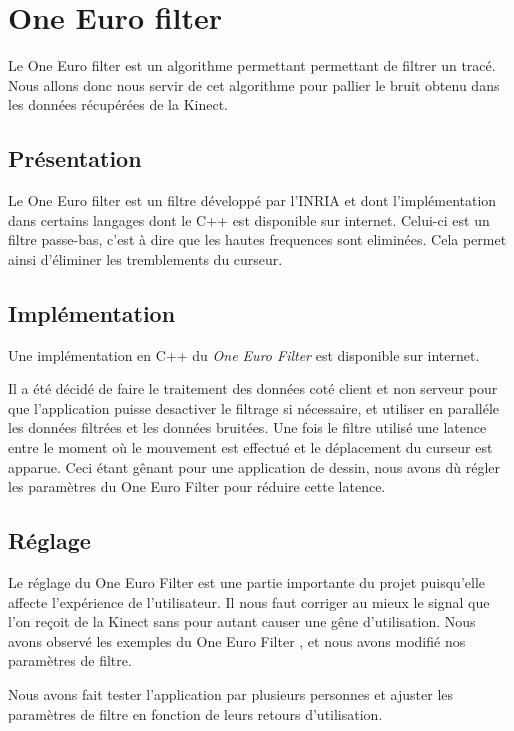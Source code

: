 \chapter{One Euro filter}

Le One Euro filter est un algorithme permettant permettant de filtrer un tracé. Nous allons donc nous servir de cet algorithme pour pallier le bruit obtenu dans les données récupérées de la Kinect.

\section{Présentation}
 Le One Euro filter \cite{oneeuro} est un filtre développé par l'INRIA et dont l'implémentation dans certains langages dont le C++ est disponible sur internet. Celui-ci est un filtre passe-bas, c'est à dire que les hautes frequences sont eliminées. Cela permet ainsi d'éliminer les tremblements du curseur.
	
\section{Implémentation}

Une implémentation en C++ du \textit{One Euro Filter} est disponible sur internet.


Il a été décidé de faire le traitement des données coté client et non serveur pour que l'application puisse desactiver le filtrage si nécessaire, et utiliser en paralléle les données filtrées et les données bruitées.
Une fois le filtre utilisé une latence entre le moment où le mouvement est effectué et le déplacement du curseur est apparue. Ceci étant gênant pour une application de dessin, nous avons dù régler les paramètres du One Euro Filter pour réduire cette latence.

\section{Réglage}

Le réglage du One Euro Filter est une partie importante du projet puisqu'elle affecte l'expérience de l'utilisateur. Il nous faut corriger au mieux le signal que l'on reçoit de la Kinect sans pour autant causer une gêne d'utilisation. Nous avons observé les exemples du One Euro Filter \cite{oneeurodemo}, et nous avons modifié nos paramètres de filtre.

Nous avons fait tester l'application par plusieurs personnes et ajuster les paramètres de filtre en fonction de leurs retours d'utilisation.

